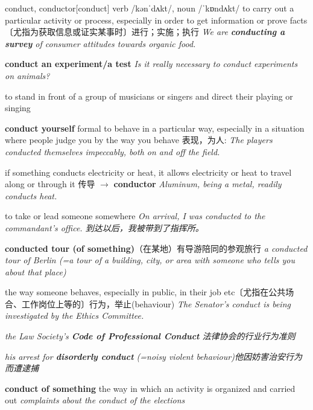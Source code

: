 \begin{DefWord}{conduct, conductor}[conduct]
    verb /kənˈdʌkt/, noun  /ˈkɒndʌkt/ 
    to carry out a particular activity or process, especially in order to get information or prove facts 〔尤指为获取信息或证实某事时〕进行；实施；执行
    \textit{We are \textbf{conducting a survey} of consumer attitudes towards organic food.}

    \textbf{conduct an experiment/a test}
    \textit{Is it really necessary to conduct experiments on animals?}

    to stand in front of a group of musicians or singers and direct their playing or singing

    \textbf{conduct yourself} formal to behave in a particular way, especially in a situation where people judge you by the way you behave 表现，为人:
    \textit{The players conducted themselves impeccably, both on and off the field.}


    if something conducts electricity or heat, it allows electricity or heat to travel along or through it 传导 $\rightarrow$ \textbf{conductor}
    \textit{Aluminum, being a metal, readily conducts heat.}

    to take or lead someone somewhere
    \textit{On arrival, I was conducted to the commandant's office. 到达以后，我被带到了指挥所。 }

    \textbf{conducted tour (of something)}（在某地）有导游陪同的参观旅行
    \textit{a conducted tour of Berlin (=a tour of a building, city, or area with someone who tells you about that place)}

    the way someone behaves, especially in public, in their job etc〔尤指在公共场合、工作岗位上等的〕行为，举止(behaviour)
    \textit{The Senator's conduct is being investigated by the Ethics Committee.}

    \textit{the Law Society's \textbf{Code of Professional Conduct} 法律协会的行业行为准则}

    \textit{his arrest for \textbf{disorderly conduct} (=noisy violent behaviour)他因妨害治安行为而遭逮捕}

    \textbf{conduct of something} the way in which an activity is organized and carried out
   \textit{complaints about the conduct of the elections}
\end{DefWord}
